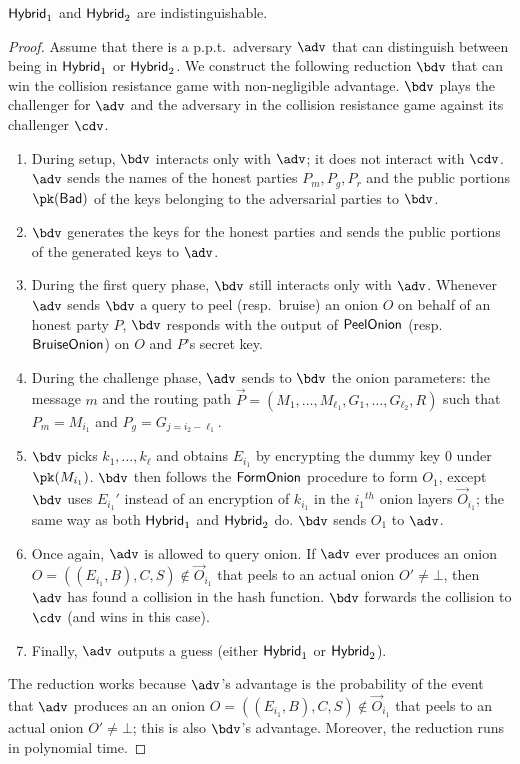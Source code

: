\documentclass[runningheads,a4paper]{llncs}
\begin{document}
\begin{lemma}
$\mathsf{Hybrid}_{1}$ and $\mathsf{Hybrid}_{2}$ are indistinguishable. 
\end{lemma}

\begin{proof}
Assume that there is a p.p.t.~adversary $\adv$ that can distinguish between being in $\mathsf{Hybrid}_{1}$ or $\mathsf{Hybrid}_{2}$. 
We construct the following reduction $\bdv$ that can win the collision resistance game with non-negligible advantage. $\bdv$ plays the challenger for $\adv$ and the adversary in the collision resistance game against its challenger $\cdv$. 
\begin{enumerate}
\item During setup, $\bdv$ interacts only with $\adv$; it does not interact with $\cdv$. $\adv$ sends the names of the honest parties $P_m, P_g, P_r$ and the public portions $\pk(\Bad)$ of the keys  belonging to the adversarial parties to $\bdv$. 

\item $\bdv$ generates the keys for the honest parties and sends the public portions of the generated keys to $\adv$. 

\item During the first query phase, $\bdv$ still interacts only with $\adv$. Whenever $\adv$ sends $\bdv$ a query to peel (resp.~bruise) an onion $O$ on behalf of an honest party $P$, $\bdv$ responds with the output of $\mathsf{PeelOnion}$ (resp.~$\mathsf{BruiseOnion}$) on $O$ and $P$'s secret key. 

\item During the challenge phase, $\adv$ sends to $\bdv$ the onion parameters: the message $m$ and the routing path $\vec{P} = (M_1, \dots, M_{\ell_1}, G_1, \dots, G_{\ell_2}, R)$ such that $P_m = M_{i_1}$ and $P_g = G_{j=i_2-\ell_1}$. 

\item $\bdv$ picks $k_1, \dots, k_\ell$ and obtains $E_{i_1}$ by encrypting the dummy key $0$ under $\pk(M_{i_1})$. 
$\bdv$ then follows the $\mathsf{FormOnion}$ procedure to form $O_1$, except $\bdv$ uses $E_{i_1}'$ instead of an encryption of $k_{i_1}$ in the ${i_1}^\mathit{th}$ onion layers $\vec{O}_{i_1}$; the same way as both $\mathsf{Hybrid}_{1}$ and $\mathsf{Hybrid}_{2}$ do. $\bdv$ sends $O_1$ to $\adv$. 

\item Once again, $\adv$ is allowed to query onion. If $\adv$ ever produces an onion $O = ((E_{i_1}, B), C, S) \not\in \vec{O}_{i_1}$ that peels to an actual onion $O'\not=\bot$, then $\adv$ has found a collision in the hash function. $\bdv$ forwards the collision to $\cdv$ (and wins in this case). 

\item Finally, $\adv$ outputs a guess (either $\mathsf{Hybrid}_{1}$ or $\mathsf{Hybrid}_{2}$). 
\end{enumerate}
The reduction works because $\adv$'s advantage is the probability of the event that $\adv$ produces an an onion $O = ((E_{i_1}, B), C, S) \not\in \vec{O}_{i_1}$ that peels to an actual onion $O'\not=\bot$; this is also $\bdv$'s advantage. Moreover, the reduction runs in polynomial time. 
\end{proof}
\end{document}
